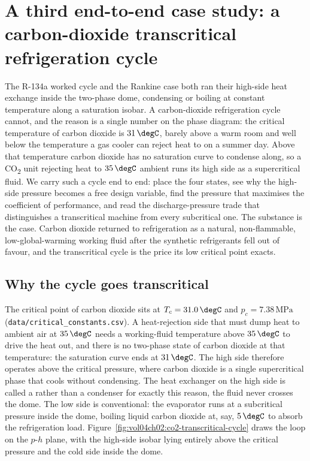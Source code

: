 \section{A third end-to-end case study: a carbon-dioxide transcritical
refrigeration cycle}

The R-134a worked cycle and the Rankine case both ran their high-side heat
exchange inside the two-phase dome, condensing or boiling at constant
temperature along a saturation isobar. A carbon-dioxide refrigeration
cycle cannot, and the reason is a single number on the phase diagram: the
critical temperature of carbon dioxide is $31\,\degC$, barely above a warm
room and well below the temperature a gas cooler can reject heat to on a
summer day. Above that temperature carbon dioxide has no saturation curve
to condense along, so a CO\textsubscript{2} unit rejecting heat to
$35\,\degC$ ambient runs its high side as a supercritical fluid. We carry
such a cycle end to end: place the four states, see why the high-side
pressure becomes a free design variable, find the pressure that maximises
the coefficient of performance, and read the discharge-pressure trade that
distinguishes a transcritical machine from every subcritical one. The
substance is the case. Carbon dioxide returned to refrigeration as a
natural, non-flammable, low-global-warming working fluid after the
synthetic refrigerants fell out of favour, and the transcritical cycle is
the price its low critical point exacts.

\subsection{Why the cycle goes transcritical}

The critical point of carbon dioxide sits at $T_c = 31.0\,\degC$ and $p_c =
7.38\,\text{MPa}$ (\texttt{data/critical\_constants.csv}). A heat-rejection
side that must dump heat to ambient air at $35\,\degC$ needs a working-fluid
temperature above $35\,\degC$ to drive the heat out, and there is no
two-phase state of carbon dioxide at that temperature: the saturation curve
ends at $31\,\degC$. The high side therefore operates above the critical
pressure, where carbon dioxide is a single supercritical phase that cools
without condensing. The heat exchanger on the high side is called a
 rather than a condenser for exactly this reason, the
fluid never crosses the dome. The low side is conventional: the evaporator
runs at a subcritical pressure inside the dome, boiling liquid
carbon dioxide at, say, $5\,\degC$ to absorb the refrigeration load.
Figure~\ref{fig:vol04ch02:co2-transcritical-cycle} draws the loop on the
$p$-$h$ plane, with the high-side isobar lying entirely above the critical
pressure and the cold side inside the dome.

